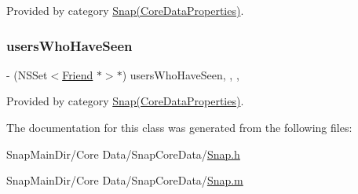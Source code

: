 Provided by category \hyperlink{category_snap_07_core_data_properties_08_a29505408f6f861f86ed6ab15807e3e70}{Snap(\+Core\+Data\+Properties)}.

\hypertarget{interface_snap_ad7eed44d77fe25a4721f170f1a526133}{}\label{interface_snap_ad7eed44d77fe25a4721f170f1a526133} 
\subsubsection{\texorpdfstring{users\+Who\+Have\+Seen}{usersWhoHaveSeen}}
{\footnotesize\ttfamily -\/ (N\+S\+Set$<$\hyperlink{interface_friend}{Friend} $\ast$$>$$\ast$) users\+Who\+Have\+Seen\hspace{0.3cm}{\ttfamily [read]}, {\ttfamily [write]}, {\ttfamily [nonatomic]}, {\ttfamily [retain]}}



Provided by category \hyperlink{category_snap_07_core_data_properties_08_ad7eed44d77fe25a4721f170f1a526133}{Snap(\+Core\+Data\+Properties)}.



The documentation for this class was generated from the following files\+:\begin{DoxyCompactItemize}
\item 
Snap\+Main\+Dir/\+Core Data/\+Snap\+Core\+Data/\hyperlink{_snap_8h}{Snap.\+h}\item 
Snap\+Main\+Dir/\+Core Data/\+Snap\+Core\+Data/\hyperlink{_snap_8m}{Snap.\+m}\end{DoxyCompactItemize}
